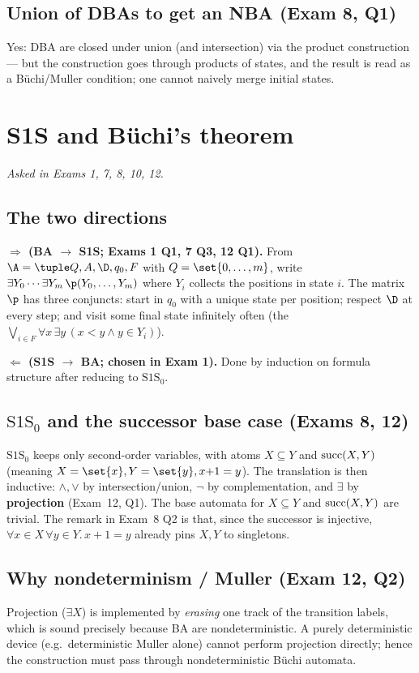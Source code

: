 \documentclass[oneside]{academica}
\begin{document}
\subsection{Union of DBAs to get an NBA (Exam 8, Q1)}
Yes: DBA are closed under union (and intersection) via the product
construction --- but the construction goes through products of states,
and the result is read as a Büchi/Muller condition; one cannot naively
merge initial states.

\section{S1S and Büchi's theorem}
\emph{Asked in Exams 1, 7, 8, 10, 12.}

\subsection{The two directions}
\textbf{$\Rightarrow$ (BA $\to$ S1S; Exams 1 Q1, 7 Q3, 12 Q1).}
From $\A=\NBA$ with $Q=\set{0,\dots,m}$, write $\exists Y_0\cdots\exists
Y_m\,\p(Y_0,\dots,Y_m)$ where $Y_i$ collects the positions in state $i$.
The matrix $\p$ has three conjuncts: start in $q_0$ with a unique state
per position; respect $\D$ at every step; and visit some final state
infinitely often (the 
$\bigvee_{i\in F}\forall x\,\exists y\,(x<y\wedge y\in Y_i)$).

\textbf{$\Leftarrow$ (S1S $\to$ BA; chosen in Exam 1).}
Done by induction on formula structure after reducing to $\text{S1S}_0$.

\subsection{\texorpdfstring{$\text{S1S}_0$}{S1S0} and the successor base case (Exams 8, 12)}
$\text{S1S}_0$ keeps only second-order variables, with atoms $X\subseteq
Y$ and $\text{succ}(X,Y)$ (meaning $X=\set{x},Y=\set{y},x{+}1=y$). The translation
is then inductive: $\wedge,\vee$ by intersection/union, $\neg$ by
complementation, and $\exists$ by \textbf{projection} (Exam~12, Q1). The
base automata for $X\subseteq Y$ and $\text{succ}(X,Y)$ are trivial. The remark in
Exam~8 Q2 is that, since the successor is injective, $\forall x\in
X\,\forall y\in Y.\,x{+}1=y$ already pins $X,Y$ to singletons.

\subsection{Why nondeterminism / Muller (Exam 12, Q2)}
Projection ($\exists X$) is implemented by \emph{erasing} one track of
the transition labels, which is sound precisely because BA are
nondeterministic. A purely deterministic device (e.g.\ deterministic
Muller alone) cannot perform projection directly; hence the construction
must pass through nondeterministic Büchi automata.
\end{document}
